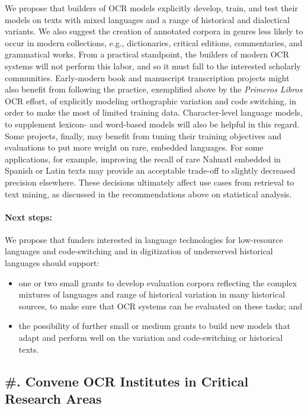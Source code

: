 \documentclass[twoside,11pt]{report}
\newcounter{reccounter}
\renewcommand{\thereccounter}{\arabic{reccounter}}
\newcommand{\recommend}[2]{\refstepcounter{reccounter}%
  \label{rec:#1}%
  \subsection{\#\thereccounter. #2}%
  \label{sec:rec-#1}}
\begin{document}
We propose that builders of OCR models explicitly develop, train, and test their models on texts with mixed languages and a range of historical and dialectical variants.  We also suggest the creation of annotated corpora in genres less likely to occur in modern collections, e.g., dictionaries, critical editions, commentaries, and grammatical works. From a practical standpoint, the builders of modern OCR systems will not perform this labor, and so it must fall to the interested scholarly communities. Early-modern book and manuscript transcription projects might also benefit from following the practice, exemplified above by the \emph{Primeros Libros} OCR effort, of explicitly modeling orthographic variation and code switching, in order to make the most of limited training data. Character-level language models, to supplement lexicon- and word-based models will also be helpful in this regard. Some projects, finally, may benefit from tuning their training objectives and evaluations to put more weight on rare, embedded languages. For some applications, for example, improving the recall of rare Nahuatl embedded in Spanish or Latin texts may provide an acceptable trade-off to slightly decreased precision elsewhere. These decisions ultimately affect use cases from retrieval to text mining, as discussed in the recommendations above on statistical analysis.

\paragraph{Next steps:} We propose that funders interested in language technologies for low-resource languages and code-switching and in digitization of underserved historical languages should support:
\begin{itemize}

\item one or two small grants to develop evaluation corpora reflecting the complex mixtures of languages and range of historical variation in many historical sources, to make sure that OCR systems can be evaluated on these tasks; and

\item the possibility of further small or medium grants to build new models that adapt and perform well on the variation and code-switching or historical texts.

\end{itemize}

\recommend{institutes}{Convene OCR Institutes in Critical Research Areas}
\end{document}
